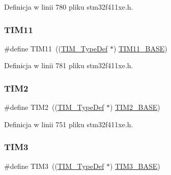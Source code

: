 Definicja w linii 780 pliku stm32f411xe.\+h.

\mbox{\label{group___peripheral__declaration_gacfd11ef966c7165f57e2cebe0abc71ad}} 
\subsubsection{\texorpdfstring{T\+I\+M11}{TIM11}}
{\footnotesize\ttfamily \#define T\+I\+M11~((\hyperlink{struct_t_i_m___type_def}{T\+I\+M\+\_\+\+Type\+Def} $\ast$) \hyperlink{group___peripheral__memory__map_ga3a4a06bb84c703084f0509e105ffaf1d}{T\+I\+M11\+\_\+\+B\+A\+SE})}



Definicja w linii 781 pliku stm32f411xe.\+h.

\mbox{\label{group___peripheral__declaration_ga3cfac9f2e43673f790f8668d48b4b92b}} 
\subsubsection{\texorpdfstring{T\+I\+M2}{TIM2}}
{\footnotesize\ttfamily \#define T\+I\+M2~((\hyperlink{struct_t_i_m___type_def}{T\+I\+M\+\_\+\+Type\+Def} $\ast$) \hyperlink{group___peripheral__memory__map_ga00d0fe6ad532ab32f0f81cafca8d3aa5}{T\+I\+M2\+\_\+\+B\+A\+SE})}



Definicja w linii 751 pliku stm32f411xe.\+h.

\mbox{\label{group___peripheral__declaration_ga61ee4c391385607d7af432b63905fcc9}} 
\subsubsection{\texorpdfstring{T\+I\+M3}{TIM3}}
{\footnotesize\ttfamily \#define T\+I\+M3~((\hyperlink{struct_t_i_m___type_def}{T\+I\+M\+\_\+\+Type\+Def} $\ast$) \hyperlink{group___peripheral__memory__map_gaf0c34a518f87e1e505cd2332e989564a}{T\+I\+M3\+\_\+\+B\+A\+SE})}



